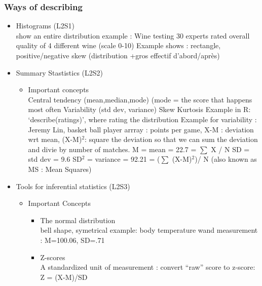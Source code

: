 \documentclass[11pt]{article}
\begin{document}
\subsubsection{Ways of describing}
\label{sec-1-1-3}
\begin{itemize}

\item Histograms (L2S1)\\
\label{sec-1-1-3-1}%
show an entire distribution
     example : Wine testing
     30 experts rated overall quality of 4 different wine (scale 0-10)
     Example shows : rectangle, positive/negative skew (distribution +gros effectif d'abord/après)
     

\item Summary Stastistics (L2S2)
\label{sec-1-1-3-2}%
\begin{itemize}

\item Important concepts\\
\label{sec-1-1-3-2-1}%
Central tendency (mean,median,mode) (mode = the score that happens most often
      Variability (std dev, variance)
      Skew
      Kurtosis
      Example in R: `describe(ratings)', where rating the distribution
      Example for variability : Jeremy Lin, basket ball player
          arrray : points per game, 
                   X-M : deviation wrt mean, 
                   (X-M)$^2$: square the deviation so that we can sum the deviation and divie by number of matches.
          M = mean = 22.7 = $\sum$ X / N
          SD = std dev = 9.6
          SD$^2$ = variance = 92.21 = ($\sum$ (X-M)$^2$)/ N 
          (also known as MS : Mean Squares)

\end{itemize} %

\item Tools for inferential statistics (L2S3)
\label{sec-1-1-3-3}%
\begin{itemize}

\item Important Concepts
\label{sec-1-1-3-3-1}%
\begin{itemize}

\item The normal distribution\\
\label{sec-1-1-3-3-1-1}%
bell shape, symetrical
       example: body temperature
                wand measurement : M=100.06, SD=.71


\item Z-scores\\
\label{sec-1-1-3-3-1-2}%
A standardized unit of measurement : convert ``raw'' score to z-score:
       Z = (X-M)/SD 


\end{itemize}
\end{itemize}
\end{itemize}
\end{document}
